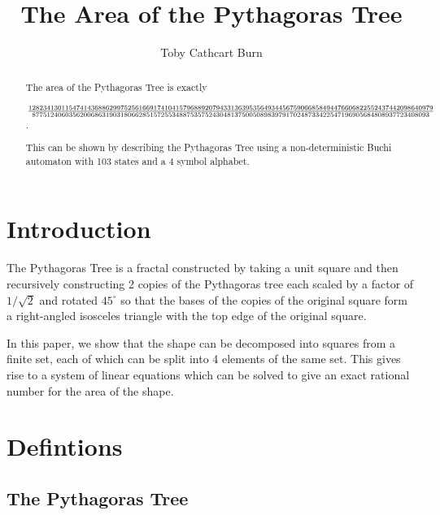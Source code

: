\documentclass{article}
\author{Toby {Cathcart Burn}}
\title{The Area of the Pythagoras Tree}
\newcommand{\bounding}{
\draw[tsty] (-2.5,1) -- (-1.5,0) -- (2.5,0) -- (3.5,1) -- (3.5,2.5) -- (2,4) -- (-1,4) -- (-2.5, 2.5) -- cycle;
}
\newcommand{\subt}[2]{
    \begin{scope}[yshift=1cm,rotate=45,scale=0.7071]
        #1
    \end{scope}
    \begin{scope}[xshift=0.5cm,yshift=1.5cm,rotate=-45,scale=0.7071]
        #2
    \end{scope}
}
\newcommand{\dup}[1]{\subt{#1}{#1}}
\newcommand{\gtree}[3]{
	#2
	\ifthenelse{#1<2}{
		#3
	}{
		\dup{\gtree{\the\numexpr#1-1}{#2}{#3}}
	}
}
\newcommand{\tree}[1]{
	\gtree{#1}{\fill[tsty] (0,0) -- (1,0) -- (1,1) -- (0,1) -- cycle;}{}
}
\begin{document}
\maketitle
\begin{abstract}
The area of the Pythagoras Tree is exactly
    
${12823413011547414368862997525616691741041579688920794331363953564934456759066858494476606822552437442098640979}\over{877512406035620068631903180662851572553488753575243048137500508983979170248733422547196905684808937723408093}$.
    
This can be shown by describing the Pythagoras Tree using a non-deterministic Buchi automaton with 103 states %
and a 4 symbol alphabet.
\end{abstract}
\section{Introduction}\label{sec:intro}
The Pythagoras Tree is a fractal constructed by taking a unit square and then recursively constructing 2 copies of the Pythagoras tree each scaled by a factor of $1/\sqrt{2}$ and rotated $45^\circ$ so that the bases of the copies of the original square form a right-angled isosceles triangle with the top edge of the original square.

\begin{center}
\end{center}
In this paper, we show that the shape can be decomposed into squares from a finite set, each of which can be split into 4 elements of the same set. This gives rise to a system of linear equations which can be solved to give an exact rational number for the area of the shape.

\newpage
\section{Defintions}
\subsection{The Pythagoras Tree}
\end{document}
